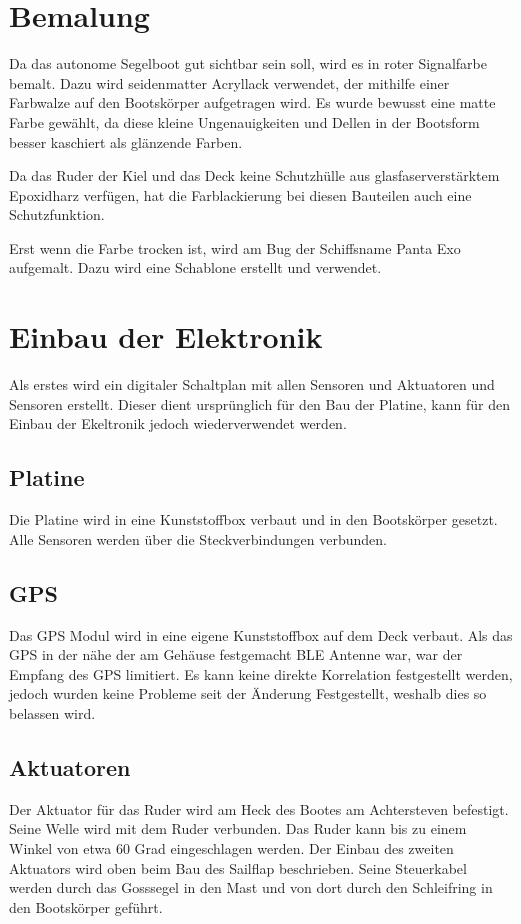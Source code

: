 \section{Bemalung}
Da das autonome Segelboot gut sichtbar sein soll, wird es in roter Signalfarbe bemalt. Dazu wird seidenmatter Acryllack verwendet, der mithilfe einer Farbwalze auf den Bootskörper aufgetragen wird. Es wurde bewusst eine matte Farbe gewählt, da diese kleine Ungenauigkeiten und Dellen in der Bootsform besser kaschiert als glänzende Farben. 

Da das Ruder der Kiel und das Deck keine Schutzhülle aus glasfaserverstärktem Epoxidharz verfügen, hat die Farblackierung bei diesen Bauteilen auch eine Schutzfunktion.

Erst wenn die Farbe trocken ist, wird am Bug der Schiffsname Panta Exo aufgemalt. Dazu wird eine Schablone erstellt und verwendet. 
\section{Einbau der Elektronik}
Als erstes wird ein digitaler Schaltplan mit allen Sensoren und Aktuatoren und Sensoren erstellt. Dieser dient ursprünglich für den Bau der Platine, kann für den Einbau der Ekeltronik jedoch wiederverwendet werden.
\subsection{Platine}
Die Platine wird in eine Kunststoffbox verbaut und in den Bootskörper gesetzt. Alle Sensoren werden über die Steckverbindungen verbunden.
\subsection{GPS}
Das GPS Modul wird in eine eigene Kunststoffbox auf dem Deck verbaut. Als das GPS in der nähe der am Gehäuse festgemacht BLE Antenne war, war der Empfang des GPS limitiert. Es kann keine direkte Korrelation festgestellt werden, jedoch wurden keine Probleme seit der Änderung Festgestellt, weshalb dies so belassen wird.  
\subsection{Aktuatoren}
Der Aktuator für das Ruder wird am Heck des Bootes am Achtersteven befestigt. Seine Welle wird mit dem Ruder verbunden. Das Ruder kann bis zu einem Winkel von etwa 60 Grad eingeschlagen werden.
Der Einbau des zweiten Aktuators wird oben beim Bau des Sailflap beschrieben. Seine Steuerkabel werden durch das Gosssegel in den Mast und von dort durch den Schleifring in den Bootskörper geführt.
